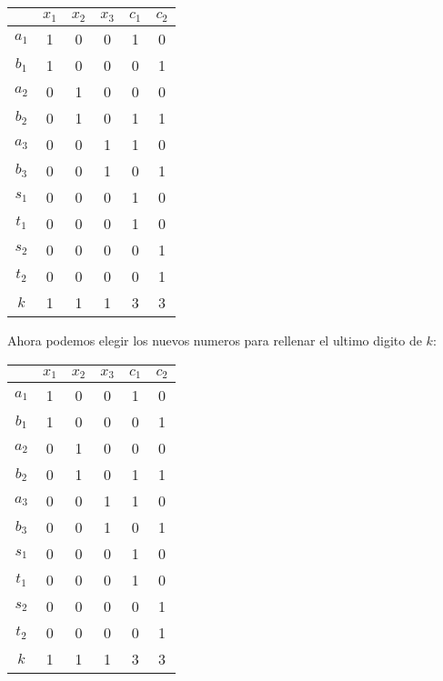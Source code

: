 \begin{table}[h!]
  \centering
  \begin{tabular}{ c|c c c | c c }
    & $x_1$ & $x_2$ & $x_3$ & $c_1$ & $c_2$ \\
    \hline 
    \rowcolor{green!30}
    $a_1$ & 1 & 0 & 0 & 1 & 0 \\
    $b_1$ & 1 & 0 & 0 & 0 & 1 \\
    $a_2$ & 0 & 1 & 0 & 0 & 0 \\
    \rowcolor{green!30}
    $b_2$ & 0 & 1 & 0 & 1 & 1 \\
    \rowcolor{green!30}
    $a_3$ & 0 & 0 & 1 & 1 & 0 \\
    $b_3$ & 0 & 0 & 1 & 0 & 1 \\
    \hline
    $s_1$ & 0 & 0 & 0 & 1 & 0 \\
    $t_1$ & 0 & 0 & 0 & 1 & 0 \\
    $s_2$ & 0 & 0 & 0 & 0 & 1 \\
    $t_2$ & 0 & 0 & 0 & 0 & 1 \\
    \hline
    $k$ & 1 & 1 & 1 & 3 & 3 \\
  \end{tabular} 
\end{table}

Ahora podemos elegir los nuevos numeros para rellenar el ultimo digito de $k$:

\begin{table}[h!]
  \centering
  \begin{tabular}{ c|c c c | c c }
    & $x_1$ & $x_2$ & $x_3$ & $c_1$ & $c_2$ \\
    \hline 
    \rowcolor{green!30}
    $a_1$ & 1 & 0 & 0 & 1 & 0 \\
    $b_1$ & 1 & 0 & 0 & 0 & 1 \\
    $a_2$ & 0 & 1 & 0 & 0 & 0 \\
    \rowcolor{green!30}
    $b_2$ & 0 & 1 & 0 & 1 & 1 \\
    \rowcolor{green!30}
    $a_3$ & 0 & 0 & 1 & 1 & 0 \\
    $b_3$ & 0 & 0 & 1 & 0 & 1 \\
    \hline
    $s_1$ & 0 & 0 & 0 & 1 & 0 \\
    $t_1$ & 0 & 0 & 0 & 1 & 0 \\
    \rowcolor{green!30}
    $s_2$ & 0 & 0 & 0 & 0 & 1 \\
    \rowcolor{green!30}      
    $t_2$ & 0 & 0 & 0 & 0 & 1 \\
    \hline
    $k$ & 1 & 1 & 1 & 3 & 3 \\
  \end{tabular} 
\end{table}

